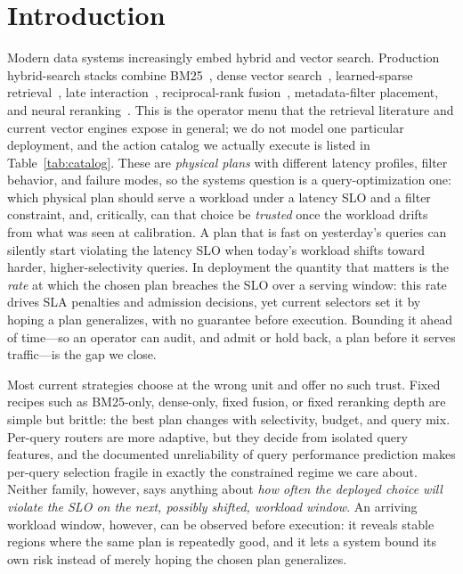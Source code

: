 \section{Introduction}
\label{sec:introduction}

Modern data systems increasingly embed hybrid and vector search. Production hybrid-search stacks combine BM25~\cite{robertson2009bm25}, dense vector search~\cite{wang2022e5}, learned-sparse retrieval~\cite{formal2021splade}, late interaction~\cite{santhanam2021colbertv2}, reciprocal-rank fusion~\cite{cormack2009rrf}, metadata-filter placement, and neural reranking~\cite{pradeep2023rankzephyr}. This is the operator menu that the retrieval literature and current vector engines expose in general; we do not model one particular deployment, and the action catalog we actually execute is listed in Table~\ref{tab:catalog}. These are \emph{physical plans} with different latency profiles, filter behavior, and failure modes, so the systems question is a query-optimization one: which physical plan should serve a workload under a latency SLO and a filter constraint, and, critically, can that choice be \emph{trusted} once the workload drifts from what was seen at calibration. A plan that is fast on yesterday's queries can silently start violating the latency SLO when today's workload shifts toward harder, higher-selectivity queries. In deployment the quantity that matters is the \emph{rate} at which the chosen plan breaches the SLO over a serving window: this rate drives SLA penalties and admission decisions, yet current selectors set it by hoping a plan generalizes, with no guarantee before execution. Bounding it ahead of time---so an operator can audit, and admit or hold back, a plan before it serves traffic---is the gap we close.

Most current strategies choose at the wrong unit and offer no such trust. Fixed recipes such as BM25-only, dense-only, fixed fusion, or fixed reranking depth are simple but brittle: the best plan changes with selectivity, budget, and query mix. Per-query routers are more adaptive, but they decide from isolated query features, and the documented unreliability of query performance prediction makes per-query selection fragile in exactly the constrained regime we care about. Neither family, however, says anything about \emph{how often the deployed choice will violate the SLO on the next, possibly shifted, workload window}. An arriving workload window, however, can be observed before execution: it reveals stable regions where the same plan is repeatedly good, and it lets a system bound its own risk instead of merely hoping the chosen plan generalizes.

